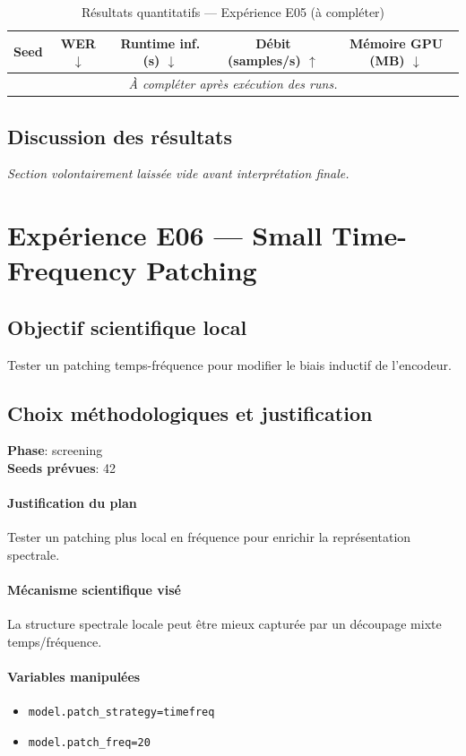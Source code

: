 \documentclass[11pt,a4paper]{article}
\begin{document}
\begin{table}[H]
\centering
\caption{Résultats quantitatifs --- Expérience E05 (à compléter)}
\begin{tabular}{lcccc}
\toprule
Seed & WER $\downarrow$ & Runtime inf. (s) $\downarrow$ & Débit (samples/s) $\uparrow$ & Mémoire GPU (MB) $\downarrow$ \\
\midrule
\multicolumn{5}{c}{\textit{À compléter après exécution des runs.}} \\
\bottomrule
\end{tabular}
\end{table}

\subsection{Discussion des résultats}
\textit{Section volontairement laissée vide avant interprétation finale.}


\section{Expérience E06 --- Small Time-Frequency Patching}
\subsection{Objectif scientifique local}
Tester un patching temps-fréquence pour modifier le biais inductif de l'encodeur.

\subsection{Choix méthodologiques et justification}
\textbf{Phase}: screening\\
\textbf{Seeds prévues}: 42\\


\paragraph{Justification du plan}
Tester un patching plus local en fréquence pour enrichir la représentation spectrale.

\paragraph{Mécanisme scientifique visé}
La structure spectrale locale peut être mieux capturée par un découpage mixte temps/fréquence.

\paragraph{Variables manipulées}
\begin{itemize}
\item \texttt{model.patch\_strategy=timefreq}
\item \texttt{model.patch\_freq=20}
\end{itemize}
\end{document}
